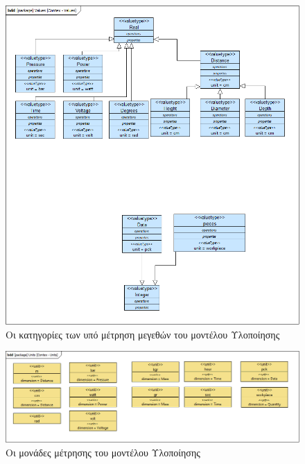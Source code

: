 \documentclass[a4paper,12pt,twoside]{report}
\begin{document}
{\begin{appendices}
				\begin{figure}[hp]
					\centering
					\includegraphics[scale=0.50]{DesignModel_Contex-Values.png}
					\caption{Οι κατηγορίες των υπό μέτρηση μεγεθών του μοντέλου Υλοποίησης}
					\label{φωτ:Οι κατηγορίες των υπό μέτρηση μεγεθών του μοντέλου Υλοποίησης}
				\end{figure}
				
				\begin{figure}[hp]
					\centering
					\includegraphics[scale=0.30]{DesignModel_Contex-Units.png}
					\caption{Οι μονάδες μέτρησης του μοντέλου Υλοποίησης}
					\label{φωτ:Οι μονάδες μέτρησης του μοντέλου Υλοποίησης}
				\end{figure}
				

\end{appendices}}
\end{document}
